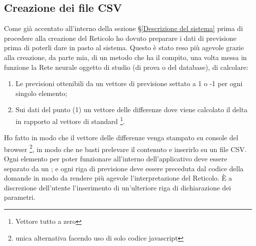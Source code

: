 \subsection{Creazione dei file CSV}
\label{Creazione dei file CSV}
Come gi\`a accentato all'interno della sezione §\ref{Descrizione del sistema} prima di procedere alla creazione del Reticolo ho dovuto preparare i dati di previsione prima di poterli dare in pasto al sistema. Questo \`e stato reso pi\`u agevole grazie alla creazione, da parte mia, di un metodo che ha il compito, una volta messa in funzione la Rete neurale oggetto di studio (di prova o del database), di calcolare:
\begin{enumerate}
\item Le previsioni ottenibili da un vettore di previsione settato a 1 o -1 per ogni singolo elemento;
\item Sui dati del punto (1) un vettore delle differenze dove viene calcolato il delta in rapporto al vettore di standard \footnote{Vettore tutto a zero}.
\end{enumerate}
\noindent
Ho fatto in modo che il vettore delle differenze venga stampato su console del browser \footnote{unica alternativa facendo uso di solo codice javascript}, in modo che ne basti prelevare il contenuto e inserirlo su un file CSV. Ogni elemento per poter funzionare all'interno dell'applicativo deve essere separato da un ; e ogni riga di previsione deve essere preceduta dal codice della domande in modo da rendere pi\`u agevole l'interpretazione del Reticolo. \`E a discrezione dell'utente l'inserimento di un'ulteriore riga di dichiarazione dei parametri.

